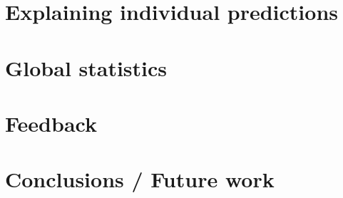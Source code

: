 \documentclass{chi2009}
\begin{document}
\section{Explaining individual predictions}
\section{Global statistics}
\section{Feedback}
\section{Conclusions / Future work}

% 
% 
% 
% 
% 
\end{document}
